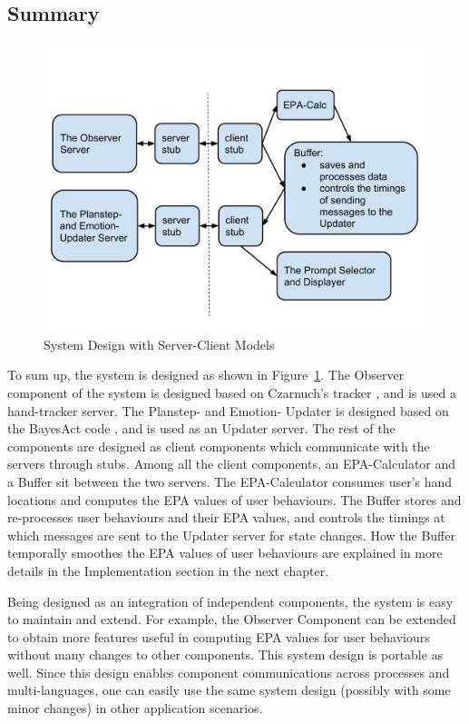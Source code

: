 \subsection{Summary}

\begin{figure}[h!]
\centering
\includegraphics[width=0.9\linewidth]{fig-system.pdf}
\caption{System Design with Server-Client Models}
\label{fig:system}
\end{figure}

To sum up, the system is designed as shown in Figure~\ref{fig:system}. The Observer component of the system is designed based on Czarnuch's tracker \cite{czarnuch2014}, and is used a hand-tracker server. The Planstep- and Emotion- Updater is designed based on the BayesAct code \cite{hoey2013bayesian}, and is used as an Updater server. The rest of the components are designed as client components which communicate with the servers through stubs. Among all the client components, an EPA-Calculator and a Buffer sit between the two servers. The EPA-Calculator consumes user's hand locations and computes the EPA values of user behaviours. The Buffer stores and re-processes user behaviours and their EPA values, and controls the timings at which messages are sent to the Updater server for state changes. How the Buffer temporally smoothes the EPA values of user behaviours are explained in more details in the Implementation section in the next chapter.

Being designed as an integration of independent components, the system is easy to maintain and extend. For example, the Observer Component can be extended to obtain more features useful in computing EPA values for user behaviours without many changes to other components. This system design is portable as well. Since this design enables component communications across processes and multi-languages, one can easily use the same system design (possibly with some minor changes) in other application scenarios.
